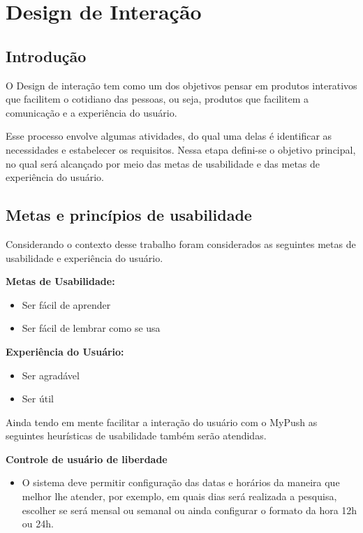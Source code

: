\part[Design de Interação]{Design de Interação}

\chapter[Introdução]{Introdução}
	
	O Design de interação tem como um dos objetivos pensar em produtos interativos que
facilitem o cotidiano das pessoas, ou seja, produtos que facilitem a comunicação e a experiência do usuário.

	Esse processo envolve algumas atividades, do qual uma delas é identificar as 
necessidades e estabelecer os requisitos. Nessa etapa defini-se o objetivo principal, no qual será alcançado por meio das metas de usabilidade e das metas de experiência do usuário.

\chapter[Metas e princípios de usabilidade]{Metas e princípios de usabilidade}

	Considerando o contexto desse trabalho foram considerados as seguintes metas 
de usabilidade e experiência do usuário.

\textbf{Metas de Usabilidade:}
\begin{itemize}
	\item Ser fácil de aprender
	\item Ser fácil de lembrar como se usa
\end{itemize}	

\textbf{Experiência do Usuário:}
\begin{itemize}
	\item Ser agradável
	\item Ser útil
\end{itemize}


	Ainda tendo em mente facilitar a interação do usuário com o MyPush as seguintes
heurísticas de usabilidade também serão atendidas.

\textbf{Controle de usuário de liberdade}
\begin{itemize}
	\item O sistema deve permitir configuração das datas e horários da maneira que melhor lhe atender, por exemplo, em quais dias será realizada a pesquisa, escolher se será mensal ou semanal ou ainda configurar o formato da hora 12h ou 24h.
\end{itemize}

